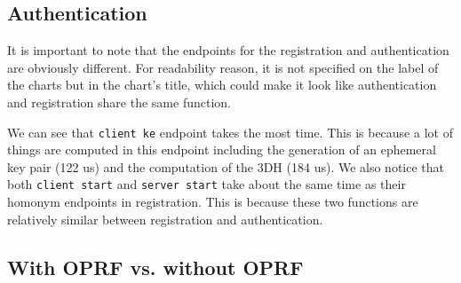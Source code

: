 ﻿\documentclass[../report.tex]{subfiles}
\begin{document}
\subsection*{Authentication}
It is important to note that the endpoints for the registration and authentication are obviously different. For readability reason, it is not specified on the label of the charts but in the chart's title, which could make it look like authentication and registration share the same function.

We can see that \verb|client ke| endpoint takes the most time. This is because a lot of things are computed in this endpoint including the generation of an ephemeral key pair (122 us) and the computation of the 3DH (184 us).
We also notice that both \verb|client start| and \verb|server start| take about the same time as their homonym endpoints in registration. This is because these two functions are relatively similar between registration and authentication.





\subsection{With OPRF vs. without OPRF} %
\end{document}
